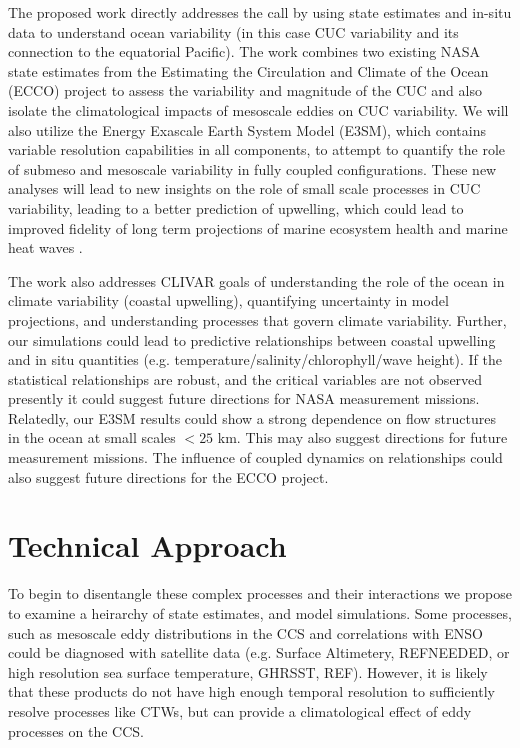 The proposed work directly addresses the call by using state estimates and in-situ data to understand ocean variability (in this case CUC variability and its connection to the equatorial Pacific).  The work combines two existing NASA state estimates from the Estimating the Circulation and Climate of the Ocean (ECCO) project to assess the variability and magnitude of the CUC and also isolate the climatological impacts of mesoscale eddies on CUC variability.  We will also utilize the Energy Exascale Earth System Model (E3SM), which contains variable resolution capabilities in all components, to attempt to quantify the role of submeso and mesoscale variability in fully coupled configurations.  These new analyses will lead to new insights on the role of small scale processes in CUC variability, leading to a better prediction of upwelling, which could lead to improved fidelity of long term projections of marine ecosystem health and marine heat waves \citep{oliver2018longer,heidemann2019marine}.

The work also addresses CLIVAR goals of understanding the role of the ocean in climate variability (coastal upwelling), quantifying uncertainty in model projections, and understanding processes that govern climate variability.  Further, our simulations could lead to predictive relationships between coastal upwelling and in situ quantities (e.g. temperature/salinity/chlorophyll/wave height).  If the statistical relationships are robust, and the critical variables are not observed presently it could suggest future directions for NASA measurement missions.  Relatedly, our E3SM results could show a strong dependence on flow structures in the ocean at small scales $< 25$ km.  This may also suggest directions for future measurement missions.  The influence of coupled dynamics on relationships could also suggest future directions for the ECCO project.

\section{Technical Approach}

To begin to disentangle these complex processes and their interactions we propose to examine a heirarchy of state estimates, and model simulations.  Some processes, such as mesoscale eddy distributions in the CCS and correlations with ENSO could be diagnosed with satellite data (e.g. Surface Altimetery, REFNEEDED, or high resolution sea surface temperature, GHRSST, REF).  However, it is likely that these products do not have high enough temporal resolution to sufficiently resolve processes like CTWs, but can provide a climatological effect of eddy processes on the CCS.

